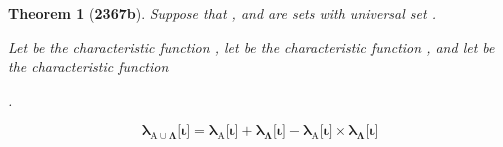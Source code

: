 \documentclass[preview]{standalone}
\newtheorem{theorem}{Theorem}
\begin{document}
\begin{theorem}[\textbf{2367b}]
    Suppose that , and \bm{$\Lambda$} are sets with universal set \bm{$\Omega$}.
    \begin{center}
        Let  be the characteristic function 
        ,
        let  be the characteristic function 
        ,
        and let \bm{$\lambda_{\Lambda}$} be the characteristic function 
        \raggedright {}.
    \end{center}
    \begin{equation*}
        \bm{
            \lambda_{\mathrm{A} \cup \Lambda} \big[ \iota \big] 
                = 
            \lambda_{\mathrm{A}} \big[ \iota \big] 
                + 
            \lambda_{\Lambda} \big[ \iota \big] 
                - 
            \lambda_{\mathrm{A}} \big[ \iota \big]
                \times 
            \lambda_{\Lambda} \big[ \iota \big]
        }
    \end{equation*}
\end{theorem}
\end{document}
